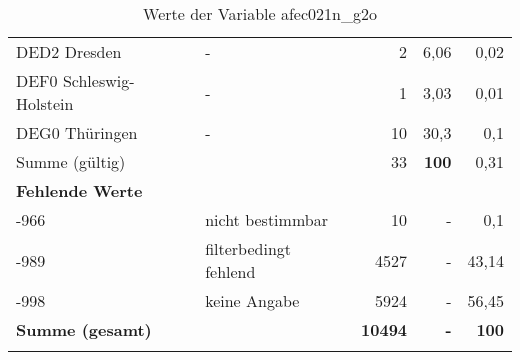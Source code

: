 \begin{longtable}{Xlrrr}
     \multicolumn{1}{X}{DED2 Dresden} &
     - &
     2 &
     6,06 &
     0,02 \\

     \multicolumn{1}{X}{DEF0 Schleswig-Holstein} &
     - &
     1 &
     3,03 &
     0,01 \\

     \multicolumn{1}{X}{DEG0 Thüringen} &
     - &
     10 &
     30,3 &
     0,1 \\
     \midrule
      \multicolumn{2}{l}{Summe (gültig)} & 33 &
      \textbf{100} &
         0,31 \\
     \multicolumn{5}{l}{\textbf{Fehlende Werte}}\\
       -966 & nicht bestimmbar & 10 & - & 0,1 \\

       -989 & filterbedingt fehlend & 4527 & - & 43,14 \\

       -998 & keine Angabe & 5924 & - & 56,45 \\

     \midrule
     \multicolumn{2}{l}{\textbf{Summe (gesamt)}} & \textbf{10494} & \textbf{-} & \textbf{100} \\
     \bottomrule
     \caption{Werte der Variable afec021n\_g2o}
     \end{longtable}
     
